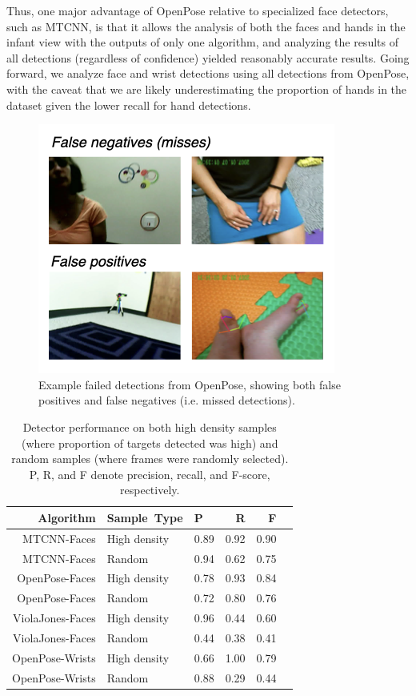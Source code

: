\documentclass[english,man]{apa6}
\begin{document}
Thus, one major advantage of OpenPose relative to specialized face
detectors, such as MTCNN, is that it allows the analysis of both the
faces and hands in the infant view with the outputs of only one
algorithm, and analyzing the results of all detections (regardless of
confidence) yielded reasonably accurate results. Going forward, we
analyze face and wrist detections using all detections from OpenPose,
with the caveat that we are likely underestimating the proportion of
hands in the dataset given the lower recall for hand detections.

\begin{figure}[H]
\includegraphics[width=0.5\linewidth]{images/example_failures} \caption{Example failed detections from OpenPose, showing both false positives and false negatives (i.e. missed detections).}\label{fig:failures}
\end{figure}

\begin{table}[ht]
\centering
\begin{tabular}{rllrrr}
\hline
Algorithm & Sample\ Type & P & R & F \\ 
\hline
MTCNN-Faces & High density & 0.89 & 0.92 & 0.90 \\ 
MTCNN-Faces & Random & 0.94 & 0.62 & 0.75 \\ 
OpenPose-Faces & High density & 0.78 & 0.93 & 0.84 \\ 
OpenPose-Faces & Random & 0.72 & 0.80 & 0.76 \\ 
ViolaJones-Faces & High density & 0.96 & 0.44 & 0.60 \\ 
ViolaJones-Faces & Random & 0.44 & 0.38 & 0.41 \\ 
OpenPose-Wrists & High density & 0.66 & 1.00 & 0.79 \\ 
OpenPose-Wrists & Random & 0.88 & 0.29 & 0.44 \\ 
\hline
\end{tabular}
\caption{Detector performance on both high density samples (where proportion of targets detected was high) and random samples (where frames were randomly selected). P, R, and F denote precision, recall, and F-score, respectively.} 
\vspace{-1em}
\end{table}
\end{document}

